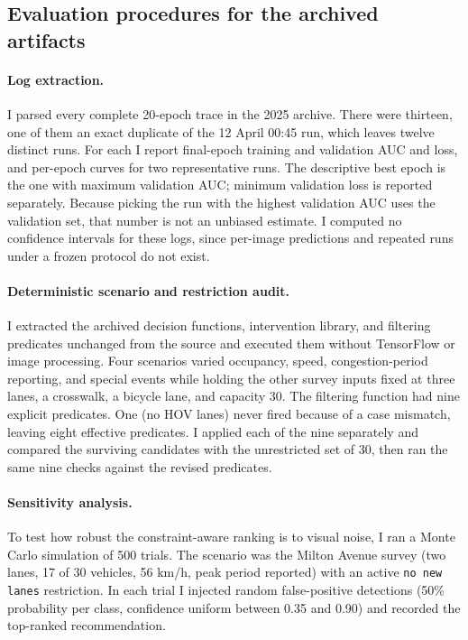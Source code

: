 \documentclass[11pt]{article}
\begin{document}
\subsection{Evaluation procedures for the archived artifacts}
\label{sec:archive-eval}
\paragraph{Log extraction.} I parsed every complete 20-epoch trace in the 2025 archive. There were thirteen, one of them an exact duplicate of the 12 April 00:45 run, which leaves twelve distinct runs. For each I report final-epoch training and validation AUC and loss, and per-epoch curves for two representative runs. The descriptive best epoch is the one with maximum validation AUC; minimum validation loss is reported separately. Because picking the run with the highest validation AUC uses the validation set, that number is not an unbiased estimate. I computed no confidence intervals for these logs, since per-image predictions and repeated runs under a frozen protocol do not exist.

\paragraph{Deterministic scenario and restriction audit.} I extracted the archived decision functions, intervention library, and filtering predicates unchanged from the source and executed them without TensorFlow or image processing. Four scenarios varied occupancy, speed, congestion-period reporting, and special events while holding the other survey inputs fixed at three lanes, a crosswalk, a bicycle lane, and capacity 30. The filtering function had nine explicit predicates. One (no HOV lanes) never fired because of a case mismatch, leaving eight effective predicates. I applied each of the nine separately and compared the surviving candidates with the unrestricted set of 30, then ran the same nine checks against the revised predicates.

\paragraph{Sensitivity analysis.} To test how robust the constraint-aware ranking is to visual noise, I ran a Monte Carlo simulation of 500 trials. The scenario was the Milton Avenue survey (two lanes, 17 of 30 vehicles, 56 km/h, peak period reported) with an active \texttt{no new lanes} restriction. In each trial I injected random false-positive detections (50\% probability per class, confidence uniform between 0.35 and 0.90) and recorded the top-ranked recommendation.
\end{document}
